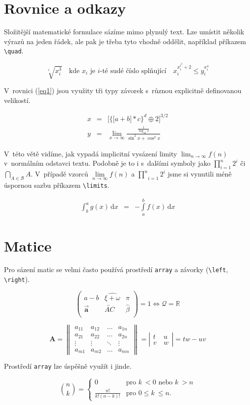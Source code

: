 \documentclass[a4paper, 11pt, twocolumn]{article}
\theoremstyle{definition}
\theoremstyle{plain}
\begin{document}
\section{Rovnice a odkazy}

Složitější matematické formulace sázíme mimo plynulý
text. Lze umístit několik výrazů na jeden řádek, ale pak je
třeba tyto vhodně oddělit, například příkazem \verb|\quad|.

$$
\sqrt[i]{x^3_i} \quad
\text{kde $x_i$ je $i$-té sudé číslo splňující}
\quad x^{x^{i^{2}}_i+2}_i \leq y^{x^{4}_i}_i
$$

V~rovnici (\ref{eq1}) jsou využity tři typy závorek s~různou
explicitně definovanou velikostí.

\begin{eqnarray}
		\label{eq1} x & = & \bigg[ \Big\{\big[a + b\big] * c\Big\}^d \oplus 2 \bigg]^{3/2}\\
		y & = & \lim_{x\to\infty} \frac{\frac{1}{\log_{10} x}}{\sin^2x + \cos^2x} \nonumber
\end{eqnarray}

V~této větě vidíme, jak vypadá implicitní vysázení limity 
$\lim_{n\to\infty} f(n)$ v~normálním odstavci textu. Podobně
je to i s~dalšími symboly jako $\prod^n_{i=1} 2^i$ či $\bigcap_{A\in\mathcal{B}} A$. V~případě
vzorců $\lim\limits_{n\to\infty} f(n)$ a $\underset{i=1}{\overset{n}{\prod}} 2^i$ jsme si vynutili méně
úspornou sazbu příkazem \verb|\limits|.

\begin{eqnarray}
    \int^a_b g(x) \, \mathrm{d}x & = & - \int\limits^b_a f(x) \, \mathrm{d}x
\end{eqnarray}

\section{Matice}

Pro sázení matic se velmi často používá prostředí \verb|array|
a závorky (\verb|\left|, \verb|\right|).

$$
		\left(
		\begin{array}{ccc}
			a - b & \widehat{\xi + \omega} & \pi \\
			\Vec{\mathbf{a}} & \overleftrightarrow{AC} & \hat{\beta}\\
		\end{array}
		\right)
		= 1 \Longleftrightarrow \mathcal{Q} = \mathbb{R}
$$

$$
		\mathbf{A} =
		\left\|
		\begin{array}{cccc}
			a_{11} & a_{12} & \ldots & a_{1n} \\
			a_{21} & a_{22} & \ldots & a_{2n} \\
			\vdots & \vdots & \ddots & \vdots \\
			a_{m1} & a_{m2} & \ldots & a_{mn}
		\end{array}
		\right\|
		=
		\left|
		\begin{array}{cc}
			t & u~\\
			v~& w
		\end{array}
		\right|
		= tw - uv
$$

Prostředí \verb|array| lze úspěšně využít i jinde.

$$
		\binom{n}{k} =
		\left\{
		\begin{array}{cl}
			0 & \text{pro } k\ < 0 \text{ nebo } k\ > n \\
			\frac{n!}{k! (n - k)!} & \text{pro } 0 \leq k\ \leq n.
		\end{array}
		\right.
$$
\end{document}
